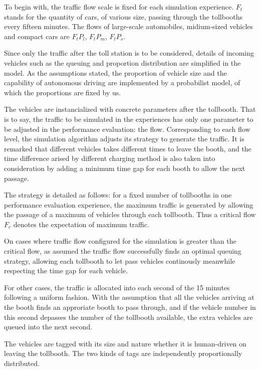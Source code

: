 \documentclass{mcmthesis}
\begin{document}
To begin with, the traffic flow scale is fixed for each simulation experience. $F_t$ stands for the quantity of cars, of various size, passing through the tollbooths every fifteen minutes. The flows of large-scale automobiles, midium-sized vehicles and compact cars are $F_tP_l$, $F_tP_m$, $F_tP_s$.

Since only the traffic after the toll station is to be considered, details of incoming vehicles such as the queuing and proportion distribution are simplified in the model. As the assumptions stated, the proportion of vehicle size and the capability of autonomous driving are implemented by a probabilist model, of which the proportions are fixed by us. 

The vehicles are instancialized with concrete parameters after the tollbooth. That is to say, the traffic to be simulated in the experiences has only one parameter to be adjusted in the performance evaluation: the flow. Corresponding to each flow level, the simulation algorithm adjusts its strategy to generate the traffic. It is remarked that different vehicles takes different times to leave the booth, and the time difference arised by different charging method is also taken into consideration by adding a minimum time gap for each booth to allow the next passage.

The strategy is detailed as follows: for a fixed number of tollbooths in one performance evaluation experience, the maximum traffic is generated by allowing the passage of a maximum of vehicles through each tollbooth. Thus a critical flow $F_c$ denotes the expectation of maximum traffic. 

On cases where traffic flow configured for the simulation is greater than the critical flow, as assumed the traffic flow successfully finds an optimal queuing strategy, allowing each tollbooth to let pass vehicles continously meanwhile respecting the time gap for each vehicle. 

For other cases, the traffic is allocated into each second of the 15 minutes following a uniform fashion. With the assumption that all the vehicles arriving at the booth finds an approriate booth to pass through, and if the vehicle number in this second depasses the number of the tollbooth available, the extra vehicles are queued into the next second.

The vehicles are tagged with its size and nature whether it is human-driven on leaving the tollbooth. The two kinds of tags are independently proportionally distributed.
\end{document}
